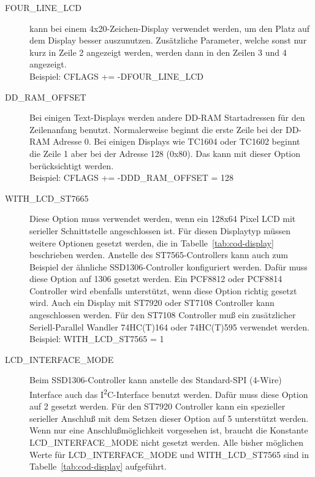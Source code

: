 \begin{description}
  \item[FOUR\_LINE\_LCD] kann bei einem 4x20-Zeichen-Display verwendet werden, um den Platz auf dem Display
besser auszunutzen. Zusätzliche Parameter, welche sonst nur kurz in Zeile 2 angezeigt werden, werden dann in
den Zeilen 3 und 4 angezeigt.\\
Beispiel: CFLAGS += -DFOUR\_LINE\_LCD

  \item[DD\_RAM\_OFFSET] Bei einigen Text-Displays werden andere DD-RAM Startadressen für den Zeilenanfang
benutzt. Normalerweise beginnt die erste Zeile bei der DD-RAM Adresse 0. Bei einigen Displays wie TC1604
oder TC1602 beginnt die Zeile 1 aber bei der Adresse 128 (0x80).
Das kann mit dieser Option berücksichtigt werden.\\
Beispiel: CFLAGS += -DDD\_RAM\_OFFSET = 128

  \item[WITH\_LCD\_ST7665] Diese Option muss verwendet werden, wenn ein 128x64 Pixel LCD mit serieller
Schnittstelle angeschlossen ist.
Für diesen Displaytyp müssen weitere Optionen gesetzt werden, die in Tabelle~\ref{tab:cod-display} 
beschrieben werden.
Anstelle des ST7565-Controllers kann auch zum Beispiel der ähnliche SSD1306-Controller konfiguriert werden.
Dafür muss diese Option auf 1306 gesetzt werden.
Ein PCF8812 oder PCF8814 Controller wird ebenfalls unterstützt, wenn diese Option richtig gesetzt wird.
Auch ein Display mit ST7920 oder ST7108 Controller kann angeschlossen werden.
Für den ST7108 Controller muß ein
zusätzlicher Seriell-Parallel Wandler 74HC(T)164 oder 74HC(T)595 verwendet werden.\\
Beispiel: WITH\_LCD\_ST7565 = 1 

 \item[LCD\_INTERFACE\_MODE] Beim SSD1306-Controller kann anstelle des Standard-SPI (4-Wire) Interface auch das
I\textsuperscript{2}C-Interface benutzt werden. Dafür muss diese Option auf 2 gesetzt werden.
Für den ST7920 Controller kann ein spezieller serieller Anschluß mit dem Setzen dieser Option auf 5
unterstützt werden.
Wenn nur eine Anschlußmöglichkeit vorgesehen ist, braucht die Konstante LCD\_INTERFACE\_MODE nicht gesetzt werden.
Alle bisher möglichen Werte für LCD\_INTERFACE\_MODE und WITH\_LCD\_ST7565 sind in Tabelle~\ref{tab:cod-display} aufgeführt.\\


\end{description}
